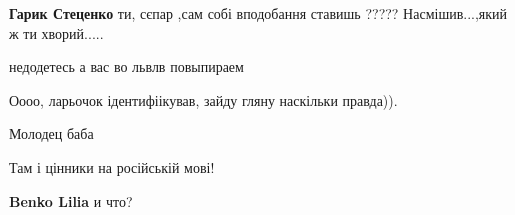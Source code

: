 \begin{itemize}
\begin{itemize}
 
\textbf{Гарик Стеценко} ти, сєпар ,сам собі вподобання ставишь ????? Насмішив...,який ж ти хворий.....

 
недодетесь а вас во львлв повыпираем
\end{itemize}

 
Оооо, ларьочок ідентифіікував, зайду гляну наскільки правда)).

 
Молодец баба

 
Там і цінники на російській мові!

\begin{itemize}
 
\textbf{Benko Lilia} и что?
\end{itemize}

\end{itemize}

